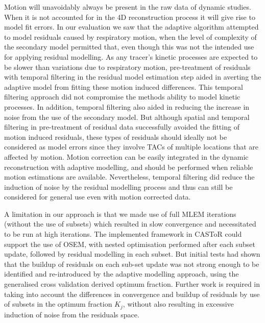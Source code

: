 Motion will unavoidably always be present in the raw data of dynamic studies. When it is not accounted for in the 4D reconstruction process it will give rise to model fit errors. In our evaluation we saw that the adaptive algorithm attempted to model residuals caused by respiratory motion, when the level of complexity of the secondary model permitted that, even though this was not the intended use for applying residual modelling.
As any tracer's kinetic processes are expected to be slower than variations due to respiratory motion, pre-treatment of residuals with temporal filtering in the residual model estimation step aided in averting the adaptive model from fitting these motion induced differences. This temporal filtering approach did not compromise the methods ability to model kinetic processes. In addition, temporal filtering also aided in reducing the increase in noise from the use of the secondary model.
But although spatial and temporal filtering in pre-treatment of residual data successfully avoided the fitting of motion induced residuals, these types of residuals should ideally not be considered as model errors since they involve TACs of multiple locations that are affected by motion. Motion correction can be easily integrated in the dynamic reconstruction with adaptive modelling, and should be performed when reliable motion estimations are available. Nevertheless, temporal filtering did reduce the induction of noise by the residual modelling process and thus can still be considered for general use even with motion corrected data.

A limitation in our approach is that we made use of full MLEM iterations (without the use of subsets) which resulted in slow convergence and necessitated to be run at high iterations. The implemented framework in CASToR could support the use of OSEM, with nested optimisation performed after each subset update, followed by residual modelling in each subset. But initial tests had shown that the buildup of residuals on each sub-set update was not strong enough to be identified and re-introduced by the adaptive modelling approach, using the generalised cross validation derived optimum fraction. Further work is required in taking into account the differences in convergence and buildup of residuals by use of subsets in the optimum fraction $K_{j}$, without also resulting in excessive induction of noise from the residuals space.


